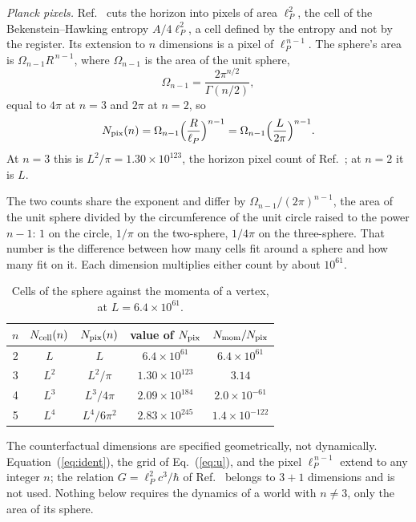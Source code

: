 \documentclass[aps,prd,twocolumn,superscriptaddress,nofootinbib]{revtex4-2}
\begin{document}
\textit{Planck pixels.} Ref.~\cite{korytko2026} cuts the horizon into pixels of area $\ell_P^2$, the cell of the Bekenstein--Hawking entropy $A/4\ell_P^2$, a cell defined by the entropy and not by the register. Its extension to $n$ dimensions is a pixel of $\ell_P^{\,n-1}$. The sphere's area is $\Omega_{n-1}R^{\,n-1}$, where $\Omega_{n-1}$ is the area of the unit sphere,
\begin{equation}
\Omega_{n-1} = \frac{2\pi^{n/2}}{\Gamma(n/2)},
\label{eq:omega}
\end{equation}
equal to $4\pi$ at $n=3$ and $2\pi$ at $n=2$, so
\begin{equation}
N_{\rm pix}(n) = \Omega_{n-1}\Big(\frac{R}{\ell_P}\Big)^{n-1} = \Omega_{n-1}\Big(\frac{L}{2\pi}\Big)^{n-1}.
\label{eq:supply}
\end{equation}
At $n=3$ this is $L^2/\pi = 1.30\times10^{123}$, the horizon pixel count of Ref.~\cite{korytko2026c}; at $n=2$ it is $L$.

The two counts share the exponent and differ by $\Omega_{n-1}/(2\pi)^{n-1}$, the area of the unit sphere divided by the circumference of the unit circle raised to the power $n-1$: $1$ on the circle, $1/\pi$ on the two-sphere, $1/4\pi$ on the three-sphere. That number is the difference between how many cells fit around a sphere and how many fit on it. Each dimension multiplies either count by about $10^{61}$.

\begin{table}[t]
\caption{Cells of the sphere against the momenta of a vertex, at $L = 6.4\times10^{61}$.}
\label{tab:count}
\begin{ruledtabular}
\begin{tabular}{ccccc}
$n$ & $N_{\rm cell}(n)$ & $N_{\rm pix}(n)$ & value of $N_{\rm pix}$ & $N_{\rm mom}/N_{\rm pix}$ \\
\hline
2 & $L$ & $L$ & $6.4\times10^{61}$ & $6.4\times10^{61}$ \\
3 & $L^2$ & $L^2/\pi$ & $1.30\times10^{123}$ & $3.14$ \\
4 & $L^3$ & $L^3/4\pi$ & $2.09\times10^{184}$ & $2.0\times10^{-61}$ \\
5 & $L^4$ & $L^4/6\pi^2$ & $2.83\times10^{245}$ & $1.4\times10^{-122}$ \\
\end{tabular}
\end{ruledtabular}
\end{table}

The counterfactual dimensions are specified geometrically, not dynamically. Equation~(\ref{eq:ident}), the grid of Eq.~(\ref{eq:u}), and the pixel $\ell_P^{\,n-1}$ extend to any integer $n$; the relation $G = \ell_P^2c^3/\hbar$ of Ref.~\cite{korytko2026} belongs to $3+1$ dimensions and is not used. Nothing below requires the dynamics of a world with $n \ne 3$, only the area of its sphere.
\end{document}
